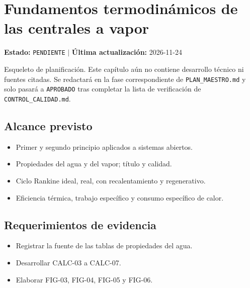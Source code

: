 \chapter{Fundamentos termodinámicos de las centrales a vapor}
\label{cap:02}

\begin{cajaestado}
\textbf{Estado:} \texttt{PENDIENTE} \quad$|$\quad
\textbf{Última actualización:} 2026-11-24

Esqueleto de planificación. Este capítulo aún no contiene desarrollo técnico ni
fuentes citadas. Se redactará en la fase correspondiente de
\texttt{PLAN\_MAESTRO.md} y solo pasará a \texttt{APROBADO} tras completar
la lista de verificación de \texttt{CONTROL\_CALIDAD.md}.
\end{cajaestado}

\section{Alcance previsto}
\begin{itemize}
  \item Primer y segundo principio aplicados a sistemas abiertos.
  \item Propiedades del agua y del vapor; título y calidad.
  \item Ciclo Rankine ideal, real, con recalentamiento y regenerativo.
  \item Eficiencia térmica, trabajo específico y consumo específico de calor.
\end{itemize}

\section{Requerimientos de evidencia}
\begin{itemize}
  \item Registrar la fuente de las tablas de propiedades del agua.
  \item Desarrollar CALC-03 a CALC-07.
  \item Elaborar FIG-03, FIG-04, FIG-05 y FIG-06.
\end{itemize}
